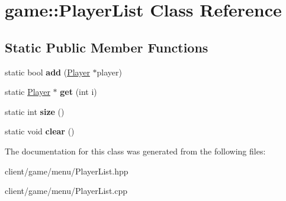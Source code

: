 \hypertarget{classgame_1_1_player_list}{\section{game\-:\-:Player\-List Class Reference}
\label{classgame_1_1_player_list}
}
\subsection*{Static Public Member Functions}
\begin{DoxyCompactItemize}
\item 
\hypertarget{classgame_1_1_player_list_ac2e1f873bceb46cda62740a91e470620}{static bool {\bfseries add} (\hyperlink{classgame_1_1_player}{Player} $\ast$player)}\label{classgame_1_1_player_list_ac2e1f873bceb46cda62740a91e470620}

\item 
\hypertarget{classgame_1_1_player_list_a04c07ab5716fab6eff93682300c5b2ef}{static \hyperlink{classgame_1_1_player}{Player} $\ast$ {\bfseries get} (int i)}\label{classgame_1_1_player_list_a04c07ab5716fab6eff93682300c5b2ef}

\item 
\hypertarget{classgame_1_1_player_list_a5d40fb2acff65e7897813fdcd5a97c8c}{static int {\bfseries size} ()}\label{classgame_1_1_player_list_a5d40fb2acff65e7897813fdcd5a97c8c}

\item 
\hypertarget{classgame_1_1_player_list_ad247695c00069a81b8f03fef1af57f18}{static void {\bfseries clear} ()}\label{classgame_1_1_player_list_ad247695c00069a81b8f03fef1af57f18}

\end{DoxyCompactItemize}


The documentation for this class was generated from the following files\-:\begin{DoxyCompactItemize}
\item 
client/game/menu/Player\-List.\-hpp\item 
client/game/menu/Player\-List.\-cpp\end{DoxyCompactItemize}
